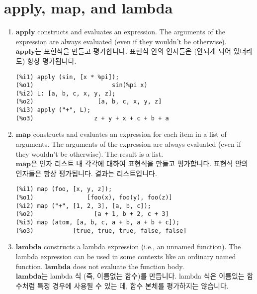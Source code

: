 \documentclass[12pt]{article}
\begin{document}
\section{apply, map, and lambda}

\begin{enumerate}

\item $\mathbf{apply}$ constructs and evaluates an expression.
The arguments of the expression are always evaluated (even if they wouldn't be otherwise). \\
$\mathbf{apply}$는 표현식을 만들고 평가합니다. 표현식 안의 인자들은 (안되게 되어 있더라도) 항상 평가됩니다. 

\begin{verbatim}
(%i1) apply (sin, [x * %pi]);
(%o1)                      sin(%pi x)
(%i2) L: [a, b, c, x, y, z];
(%o2)                  [a, b, c, x, y, z]
(%i3) apply ("+", L);
(%o3)                 z + y + x + c + b + a
\end{verbatim}

\item $\mathbf{map}$ constructs and evaluates an expression for each item in a list of arguments.
The arguments of the expression are always evaluated (even if they wouldn't be otherwise).
The result is a list. \\
$\mathbf{map}$은 인자 리스트 내 각각에 대하여 표현식을 만들고 평가합니다. 표현식 안의 인자들은 항상 평가됩니다. 
결과는 리스트입니다. 


\begin{verbatim}
(%i1) map (foo, [x, y, z]);
(%o1)               [foo(x), foo(y), foo(z)]
(%i2) map ("+", [1, 2, 3], [a, b, c]);
(%o2)                 [a + 1, b + 2, c + 3]
(%i3) map (atom, [a, b, c, a + b, a + b + c]);
(%o3)           [true, true, true, false, false]
\end{verbatim}

\item $\mathbf{lambda}$ constructs a lambda expression (i.e., an unnamed function).
The lambda expression can be used in some contexts like an ordinary named function.
$\mathbf{lambda}$ does not evaluate the function body. \\
$\mathbf{lambda}$는 lambda 식 (즉, 이름없는 함수)를 만듭니다. 
lambda 식은 이름있는 함수처럼 특정 경우에 사용될 수 있는 데, 함수 본체를 평가하지는 않습니다.


\end{enumerate}
\end{document}

